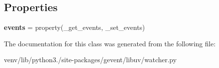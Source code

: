 \subsection*{Properties}
\begin{DoxyCompactItemize}
\item 
\mbox{\label{classgevent_1_1libuv_1_1watcher_1_1io_a6ebe2c8b60626e6035574d2509af2214}} 
{\bfseries events} = property(\+\_\+get\+\_\+events, \+\_\+set\+\_\+events)
\end{DoxyCompactItemize}


The documentation for this class was generated from the following file\+:\begin{DoxyCompactItemize}
\item 
venv/lib/python3./site-\/packages/gevent/libuv/watcher.\+py\end{DoxyCompactItemize}
